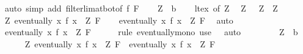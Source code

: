 \begin{isabellebody}
%
\isadelimproof
%
\endisadelimproof
%
\isatagproof
{}\isamarkupfalse%
\ {\isacharparenleft}{\kern0pt}auto\ simp\ add{\isacharcolon}{\kern0pt}\ filterlim{\isacharunderscore}{\kern0pt}at{\isacharunderscore}{\kern0pt}bot{\isacharbrackleft}{\kern0pt}of\ f\ F{\isacharbrackright}{\kern0pt}{\isacharparenright}{\kern0pt}\isanewline
\ \ \isamarkupfalse%
\ Z\ {\isacharcolon}{\kern0pt}{\isacharcolon}{\kern0pt}\ {\isacharprime}{\kern0pt}b\isanewline
\ \ \isamarkupfalse%
\ lt{\isacharunderscore}{\kern0pt}ex\ {\isacharbrackleft}{\kern0pt}of\ Z{\isacharbrackright}{\kern0pt}\ \isamarkupfalse%
\ Z{\isacharprime}{\kern0pt}\ \ {}{\isacharcolon}{\kern0pt}\ {\isachardoublequoteopen}Z{\isacharprime}{\kern0pt}\ {\isacharless}{\kern0pt}\ Z{\isachardoublequoteclose}\ \isacommand{{\isachardot}{\kern0pt}{\isachardot}{\kern0pt}}\isamarkupfalse%
\isanewline
\ \ \isamarkupfalse%
\ {\isachardoublequoteopen}{\isasymforall}Z{\isachardot}{\kern0pt}\ eventually\ {\isacharparenleft}{\kern0pt}{\isasymlambda}x{\isachardot}{\kern0pt}\ f\ x\ {\isasymle}\ Z{\isacharparenright}{\kern0pt}\ F{\isachardoublequoteclose}\isanewline
\ \ \isamarkupfalse%
\ {\isachardoublequoteopen}eventually\ {\isacharparenleft}{\kern0pt}{\isasymlambda}x{\isachardot}{\kern0pt}\ f\ x\ {\isasymle}\ Z{\isacharprime}{\kern0pt}{\isacharparenright}{\kern0pt}\ F{\isachardoublequoteclose}\ \isamarkupfalse%
\ auto\isanewline
\ \ \isamarkupfalse%
\ {\isachardoublequoteopen}eventually\ {\isacharparenleft}{\kern0pt}{\isasymlambda}x{\isachardot}{\kern0pt}\ f\ x\ {\isacharless}{\kern0pt}\ Z{\isacharparenright}{\kern0pt}\ F{\isachardoublequoteclose}\isanewline
\ \ \ \ \isamarkupfalse%
\ {\isacharparenleft}{\kern0pt}rule\ eventually{\isacharunderscore}{\kern0pt}mono{\isacharparenright}{\kern0pt}\ {\isacharparenleft}{\kern0pt}use\ {}\ \ auto{\isacharparenright}{\kern0pt}\isanewline
\ \ \isamarkupfalse%
\isanewline
\ \ \ \ \isamarkupfalse%
\ Z\ {\isacharcolon}{\kern0pt}{\isacharcolon}{\kern0pt}\ {\isacharprime}{\kern0pt}b\isanewline
\ \ \ \ \isamarkupfalse%
\ {\isachardoublequoteopen}{\isasymforall}Z{\isachardot}{\kern0pt}\ eventually\ {\isacharparenleft}{\kern0pt}{\isasymlambda}x{\isachardot}{\kern0pt}\ f\ x\ {\isacharless}{\kern0pt}\ Z{\isacharparenright}{\kern0pt}\ F\ {\isasymLongrightarrow}\ eventually\ {\isacharparenleft}{\kern0pt}{\isasymlambda}x{\isachardot}{\kern0pt}\ f\ x\ {\isasymle}\ Z{\isacharparenright}{\kern0pt}\ F{\isachardoublequoteclose}\isanewline

\end{isabellebody}
